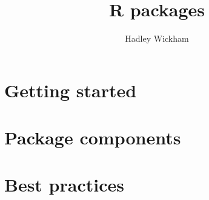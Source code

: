 \documentclass{book}
\title{R packages}
\author{Hadley Wickham}
\begin{document}
\frontmatter
\maketitle

\tableofcontents

\mainmatter

\part{Getting started}

\part{Package components}











\part{Best practices}



\end{document}
